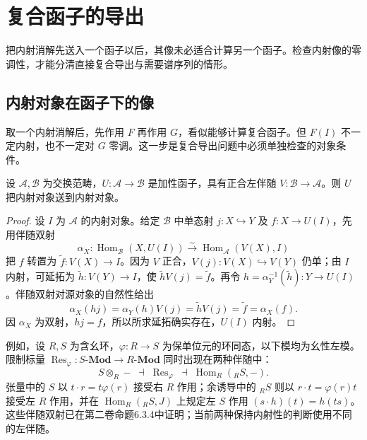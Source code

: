 
\section{复合函子的导出}
\label{b4:sec:1004}

把内射消解先送入一个函子以后，其像未必适合计算另一个函子。检查内射像的零调性，才能分清直接复合导出与需要谱序列的情形。

%
%
%

\subsection{内射对象在函子下的像}
\label{b4:subsec:1004:01}

取一个内射消解后，先作用 \(F\) 再作用 \(G\)，看似能够计算复合函子。但 \(F(I)\) 不一定内射，也不一定对 \(G\) 零调。这一步是复合导出问题中必须单独检查的对象条件。

\begin{proposition}\label{b4:prop:right-adjoint-injectives}
	设 \(\mathcal A,\mathcal B\) 为交换范畴，\(U:\mathcal A\to\mathcal B\) 是加性函子，具有正合左伴随 \(V:\mathcal B\to\mathcal A\)。则 \(U\) 把内射对象送到内射对象。
\end{proposition}
\begin{proof}
	设 \(I\) 为 \(\mathcal A\) 的内射对象。给定 \(\mathcal B\) 中单态射 \(j:X\hookrightarrow Y\) 及 \(f:X\to U(I)\)，先用伴随双射
	\[
		\alpha_X:\operatorname{Hom}_{\mathcal B}(X,U(I)) \xrightarrow{\sim}\operatorname{Hom}_{\mathcal A}(V(X),I)
	\]
	把 \(f\) 转置为 \(\widetilde f:V(X)\to I\)。因为 \(V\) 正合，\(V(j):V(X)\hookrightarrow V(Y)\) 仍单；由 \(I\) 内射，可延拓为 \(\widetilde h:V(Y)\to I\)，使 \(\widetilde hV(j)=\widetilde f\)。再令 \(h=\alpha_Y^{-1}(\widetilde h):Y\to U(I)\)。伴随双射对源对象的自然性给出
	\[
		\alpha_X(hj)=\alpha_Y(h)V(j) =\widetilde hV(j)=\widetilde f=\alpha_X(f).
	\]
	因 \(\alpha_X\) 为双射，\(hj=f\)，所以所求延拓确实存在，\(U(I)\) 内射。
\end{proof}

例如，设 \(R,S\) 为含幺环，\(\varphi:R\to S\) 为保单位元的环同态，以下模均为幺性左模。限制标量 \(\operatorname{Res}_{\varphi}:S\text{-}\mathbf{Mod}\to R\text{-}\mathbf{Mod}\) 同时出现在两种伴随中：
\[
	S\otimes_R-\;\dashv\;\operatorname{Res}_{\varphi} \;\dashv\;\operatorname{Hom}_R({}_RS,-).
\]
张量中的 \(S\) 以 \(t\cdot r=t\varphi(r)\) 接受右 \(R\) 作用；余诱导中的 \({}_RS\) 则以 \(r\cdot t=\varphi(r)t\) 接受左 \(R\) 作用，并在 \(\operatorname{Hom}_R({}_RS,J)\) 上规定左 \(S\) 作用 \((s\cdot h)(t)=h(ts)\)。这些伴随双射已在第二卷命题6.3.4中证明；当前两种保持内射性的判断使用不同的左伴随。

